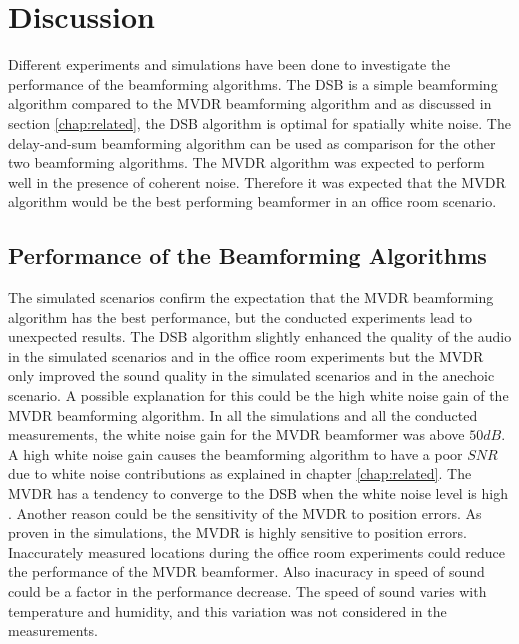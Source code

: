 \chapter{Discussion}
\label{chap:discussion}

Different experiments and simulations have been done to investigate the performance of the beamforming algorithms. The DSB is a simple beamforming algorithm compared to the MVDR beamforming algorithm and as discussed in section \ref{chap:related}, the DSB algorithm is optimal for spatially white noise. The delay-and-sum beamforming algorithm can be used as comparison for the other two beamforming algorithms. The MVDR algorithm was expected to perform well in the presence of coherent noise. Therefore it was expected that the MVDR algorithm would be the best performing beamformer in an office room scenario.

\section{Performance of the Beamforming Algorithms}
The simulated scenarios confirm the expectation that the MVDR beamforming algorithm has the best performance, but the conducted experiments lead to unexpected results. The DSB algorithm slightly enhanced the quality of the audio in the simulated scenarios and in the office room experiments but the MVDR only improved the sound quality in the simulated scenarios and in the anechoic scenario. A possible explanation for this could be the high white noise gain of the MVDR beamforming algorithm. In all the simulations and all the conducted measurements, the white noise gain for the MVDR beamformer was above $50dB$. A high white noise gain causes the beamforming algorithm to have a poor $SNR$ due to white noise contributions as explained in chapter \ref{chap:related}. The MVDR has a tendency to converge to the DSB when the white noise level is high \cite{gannot2010}.
Another reason could be the sensitivity of the MVDR to position errors. As proven in the simulations, the MVDR is highly sensitive to position errors. Inaccurately measured locations during the office room experiments could reduce the performance of the MVDR beamformer. Also inacuracy in speed of sound could be a factor in the performance decrease. The speed of sound varies with temperature and humidity, and this variation was not considered in the measurements.


